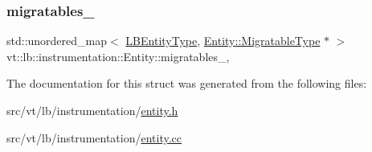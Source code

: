\mbox{\label{structvt_1_1lb_1_1instrumentation_1_1_entity_a1c2098186f1b468294ec3cd8beb0ffbc}} 
\subsubsection{\texorpdfstring{migratables\+\_\+}{migratables\_}}
{\footnotesize\ttfamily std\+::unordered\+\_\+map$<$ \hyperlink{namespacevt_a92ec26fb6644cd0ba7eb0ee70c96bee5}{L\+B\+Entity\+Type}, \hyperlink{structvt_1_1lb_1_1instrumentation_1_1_entity_a40dd6e30c20027d66b9193323d9e0cb0}{Entity\+::\+Migratable\+Type} $\ast$ $>$ vt\+::lb\+::instrumentation\+::\+Entity\+::migratables\+\_\+\hspace{0.3cm}{\ttfamily [static]}, {\ttfamily [private]}}



The documentation for this struct was generated from the following files\+:\begin{DoxyCompactItemize}
\item 
src/vt/lb/instrumentation/\hyperlink{lb_2instrumentation_2entity_8h}{entity.\+h}\item 
src/vt/lb/instrumentation/\hyperlink{entity_8cc}{entity.\+cc}\end{DoxyCompactItemize}
